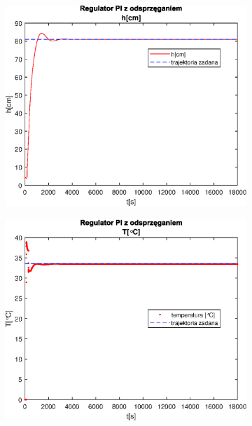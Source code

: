 \begin{figure}[h!]
   \centering
   \begin{subfigure}[b]{0.4\textwidth}
      \includegraphics[width=1\linewidth]{img/PI/decoupler/noDisturbance/PIDecouplerH0.eps}
      \caption{}
      \label{fig:fig:PIDecoupler01}
   \end{subfigure}
       
   \begin{subfigure}[b]{0.4\textwidth}
      \includegraphics[width=1\linewidth]{img/PI/decoupler/noDisturbance/PIDecouplerT0.eps}
      \caption{}
      \label{fig:fig:PIDecoupler02}
   \end{subfigure}
       

\end{figure}
